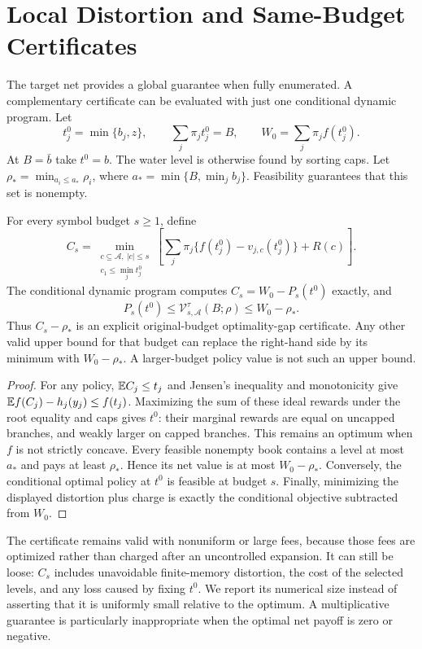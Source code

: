 \section{Local Distortion and Same-Budget Certificates}\label{sec:r45-certificates}
The target net provides a global guarantee when fully enumerated. A complementary certificate can be evaluated with just one conditional dynamic program. Let
\[
 t_j^0=\min\{b_j,z\},\qquad \sum_j\pi_jt_j^0=B,
 \qquad W_0=\sum_j\pi_jf(t_j^0).
\]
At $B=\bar b$ take $t^0=b$. The water level is otherwise found by sorting caps. Let $\rho_* =\min_{a_i\leq a_*}\rho_i$, where $a_*=\min\{B,\min_jb_j\}$. Feasibility guarantees that this set is nonempty.

\begin{theorem}\label{thm:r45-jensen}
For every symbol budget $s\geq1$, define
\[
 C_s=\min_{\substack{c\subseteq\mathcal A,\ |c|\leq s\\c_1\leq\min_jt_j^0}}
 \left[\sum_j\pi_j\{f(t_j^0)-v_{j,c}(t_j^0)\}+R(c)\right].
\]
The conditional dynamic program computes $C_s=W_0-P_s(t^0)$ exactly, and
\begin{equation}\label{eq:r45-jensen}
 P_s(t^0)\leq\mathcal V_{s,\mathcal A}^{\tau}(B;\rho)\leq W_0-\rho_*.
\end{equation}
Thus $C_s-\rho_*$ is an explicit original-budget optimality-gap certificate. Any other valid upper bound for that budget can replace the right-hand side by its minimum with $W_0-\rho_*$. A larger-budget policy value is not such an upper bound.
\end{theorem}
\begin{proof}
For any policy, $\mathbb E C_j\leq t_j$ and Jensen's inequality and monotonicity give $\mathbb E f(C_j)-h_j(y_j)\leq f(t_j)$. Maximizing the sum of these ideal rewards under the root equality and caps gives $t^0$: their marginal rewards are equal on uncapped branches, and weakly larger on capped branches. This remains an optimum when $f$ is not strictly concave. Every feasible nonempty book contains a level at most $a_*$ and pays at least $\rho_*$. Hence its net value is at most $W_0-\rho_*$. Conversely, the conditional optimal policy at $t^0$ is feasible at budget $s$. Finally, minimizing the displayed distortion plus charge is exactly the conditional objective subtracted from $W_0$.
\end{proof}

The certificate remains valid with nonuniform or large fees, because those fees are optimized rather than charged after an uncontrolled expansion. It can still be loose: $C_s$ includes unavoidable finite-memory distortion, the cost of the selected levels, and any loss caused by fixing $t^0$. We report its numerical size instead of asserting that it is uniformly small relative to the optimum. A multiplicative guarantee is particularly inappropriate when the optimal net payoff is zero or negative.

